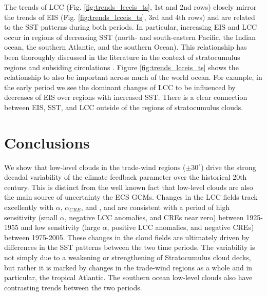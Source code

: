 The trends of LCC (Fig. \ref{fig:trends_lcceis_ts}, 1st and 2nd rows) closely mirror the trends of EIS (Fig. \ref{fig:trends_lcceis_ts}, 3rd and 4th rows) and are related to the SST patterns during both periods.  In particular, increasing EIS and LCC occur in regions of decreasing SST (north- and south-eastern Pacific, the Indian ocean, the southern Atlantic, and the southern Ocean).  This relationship has been thoroughly discussed in the literature in the context of stratocumulus regions and subsiding circulations \citep [e.g.,][]{Klein_Hartmann_1993, Wood_Bretherton_2006, Myers_Norris_2013, Qu_etal_2014, Qu_etal_2015}.  Figure \ref{fig:trends_lcceis_ts} shows the relationship to also be important across much of the world ocean.   For example, in the early period we see the dominant changes of LCC to be influenced by decreases of EIS over regions with increased SST.  There is a clear connection between EIS, SST, and LCC outside of the regions of stratocumulus clouds. 


\section{Conclusions}

We show that low-level clouds in the trade-wind regions ($\pm 30^{\circ}$) drive the strong decadal variability of the climate feedback parameter over the historical 20th century.  This is distinct from the well known fact that low-level clouds are also the main source of uncertainty  the ECS  GCMs.  
Changes in the LCC fields track excellently with $\alpha$, $\alpha_{CRE}$, and , and are consistent with a period of high sensitivity (small $\alpha$, negative LCC anomalies, and CREs near zero) between 1925-1955 and low sensitivity (large $\alpha$, positive LCC anomalies, and negative CREs) between 1975-2005.   These changes in the cloud fields are ultimately driven by differences in the SST patterns between the two time periods.  The variability is not simply due to a weakening or strengthening of Stratocumulus cloud decks, but rather it is marked by changes in the trade-wind regions as a whole and in particular, the tropical Atlantic.   The southern ocean low-level clouds also have contrasting trends between the two periods.

